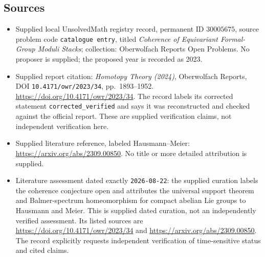 \documentclass[11pt]{article}
\begin{document}
\subsection{Sources}
\begin{itemize}
\item Supplied local UnsolvedMath registry record, permanent ID \(30005675\), source problem code \texttt{catalogue entry}, titled \emph{Coherence of Equivariant Formal-Group Moduli Stacks}; collection: Oberwolfach Reports Open Problems. No proposer is supplied; the proposed year is recorded as 2023.
\item Supplied report citation: \emph{Homotopy Theory (2024)}, Oberwolfach Reports, DOI \texttt{10.4171/owr/2023/34}, pp.\ 1893--1952. \url{https://doi.org/10.4171/owr/2023/34}. The record labels its corrected statement \texttt{corrected\_verified} and says it was reconstructed and checked against the official report. These are supplied verification claims, not independent verification here.
\item Supplied literature reference, labeled Hausmann--Meier: \url{https://arxiv.org/abs/2309.00850}. No title or more detailed attribution is supplied.
\item Literature assessment dated exactly \texttt{2026-08-22}: the supplied curation labels the coherence conjecture open and attributes the universal support theorem and Balmer-spectrum homeomorphism for compact abelian Lie groups to Hausmann and Meier. This is supplied dated curation, not an independently verified assessment. Its listed sources are \url{https://doi.org/10.4171/owr/2023/34} and \url{https://arxiv.org/abs/2309.00850}. The record explicitly requests independent verification of time-sensitive status and cited claims.
\end{itemize}
\end{document}
